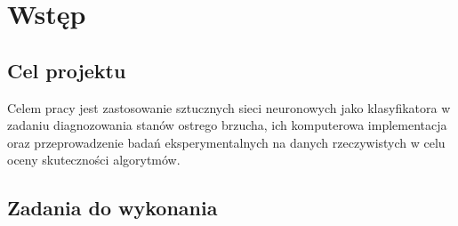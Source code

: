 %
%
%
%
%
%





    \maketitle
    \tableofcontents

    \chapter{Wstęp}\label{ch:wstęp}

    \section{Cel projektu}\label{sec:celProjektu}

    Celem pracy jest zastosowanie sztucznych sieci neuronowych jako klasyfikatora w zadaniu diagnozowania stanów ostrego brzucha, ich komputerowa implementacja oraz przeprowadzenie badań eksperymentalnych na danych rzeczywistych w celu oceny skuteczności algorytmów.

    \section{Zadania do wykonania}\label{sec:zadaniaDoWykonania}

